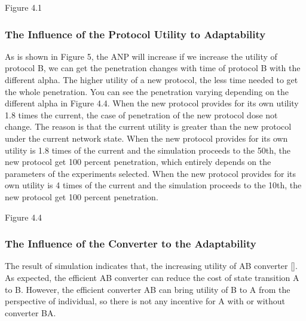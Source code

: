 \documentclass{article}
\begin{document}
Figure 4.1

\subsubsection{The Influence of the Protocol Utility to Adaptability}
As is shown in Figure 5, the ANP will increase if we increase the utility of protocol B, we can get the penetration 
changes with time of protocol B with the different alpha. The higher utility of a new protocol, the less time needed to get 
the whole penetration. You can see the penetration varying depending on the different alpha in Figure 4.4. When the new 
protocol provides for its own utility 1.8 times the current, the case of penetration of the new protocol dose not change. 
The reason is that the current utility is greater than the new protocol under the current network state. When the new 
protocol provides for its own utility is 1.8 times of the current and the simulation proceeds to the 50th,  the new protocol 
get 100 percent penetration, which entirely depends on the parameters of the experiments selected. When the new protocol 
provides for its own utility is 4 times of the current and the simulation proceeds to the 10th, the new protocol get 100 percent penetration.

Figure 4.4

\subsubsection{The Influence of the Converter to the Adaptability}
The result of simulation indicates that, the increasing utility of AB converter []. As expected, the efficient AB 
converter can reduce the cost of state transition A to B. However, the efficient converter AB can bring utility of B to A 
from the perspective of individual, so there is not any incentive for A with or without converter BA.
\end{document}
